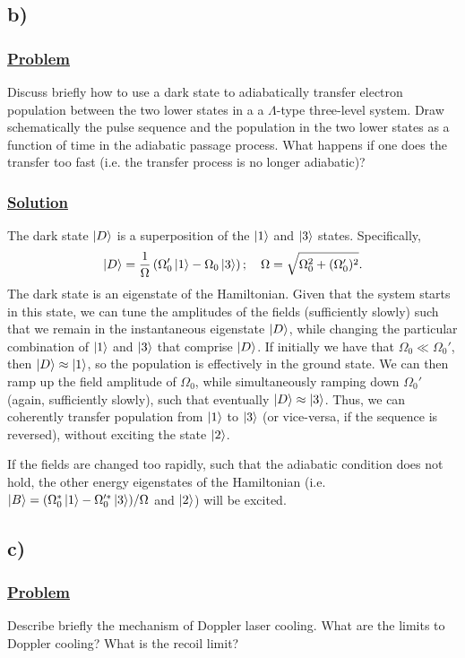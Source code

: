 \documentclass[12pt]{article}
\begin{document}
\subsection*{b)}
\subsubsection*{\underline{Problem}}
Discuss briefly how to use a dark state to adiabatically transfer electron population between the two lower states in a a $\Lambda$-type three-level system.
Draw schematically the pulse sequence and the population in the two lower states as a function of time in the adiabatic passage process.
What happens if one does the transfer too fast (i.e. the transfer process is no longer adiabatic)?

\subsubsection*{\underline{Solution}}
The dark state $\ket{D}$ is a superposition of the $\ket{1}$ and $\ket{3}$ states. Specifically,
\[ \ket{D} = \frac{1}{\Omega}\left(\Omega_0'\ket{1} - \Omega_0\ket{3}\right); \quad \Omega = \sqrt{\Omega_0^2 + (\Omega_0')^2}. \]
The dark state is an eigenstate of the Hamiltonian. 
Given that the system starts in this state, we can tune the amplitudes of the fields (sufficiently slowly) such that we remain in the instantaneous eigenstate $\ket{D}$, while changing the particular combination of $\ket{1}$ and $\ket{3}$ that comprise $\ket{D}$.
If initially we have that $\Omega_0 \ll \Omega_0'$, then $\ket{D} \approx \ket{1}$, so the population is effectively in the ground state.
We can then ramp up the field amplitude of $\Omega_0$, while simultaneously ramping down $\Omega_0'$ (again, sufficiently slowly), such that eventually $\ket{D} \approx \ket{3}$.
Thus, we can coherently transfer population from $\ket{1}$ to $\ket{3}$ (or vice-versa, if the sequence is reversed), without exciting the state $\ket{2}$.

If the fields are changed too rapidly, such that the adiabatic condition does not hold, the other energy eigenstates of the Hamiltonian (i.e. $\ket{B} = (\Omega_0^*\ket{1} - \Omega_0'^*\ket{3})/\Omega$ and $\ket{2}$) will be excited.

\subsection*{c)}
\subsubsection*{\underline{Problem}}
Describe briefly the mechanism of Doppler laser cooling.
What are the limits to Doppler cooling? What is the recoil limit?
\end{document}

